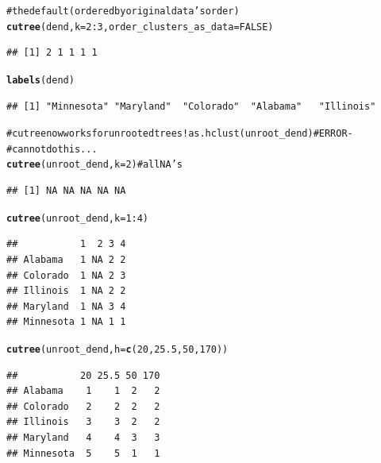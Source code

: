 \documentclass[shortnames,nojss,article]{jss}\usepackage{graphicx, color}
\makeatletter
\newcommand{\hlfunctioncall}[1]{\textcolor[rgb]{0.501960784313725,0,0.329411764705882}{\textbf{#1}}}%
\newcommand{\hlcomment}[1]{\textcolor[rgb]{0.180392156862745,0.6,0.341176470588235}{#1}}%
\newenvironment{kframe}{%
 \def\at@end@of@kframe{}%
 \ifinner\ifhmode%
  \def\at@end@of@kframe{\end{minipage}}%
  \begin{minipage}{\columnwidth}%
 \fi\fi%
 \def\FrameCommand##1{\hskip\@totalleftmargin \hskip-\fboxsep
 \colorbox{shadecolor}{##1}\hskip-\fboxsep
     \hskip-\linewidth \hskip-\@totalleftmargin \hskip\columnwidth}%
 \MakeFramed {\advance\hsize-\width
   \@totalleftmargin\z@ \linewidth\hsize
   \@setminipage}}%
 {\par\unskip\endMakeFramed%
 \at@end@of@kframe}
\newenvironment{knitrout}{}{} %
\makeatother
\begin{document}
\begin{knitrout}
\begin{kframe}
\begin{alltt}
\hlcomment{# the default (ordered by original data's order)}
\hlfunctioncall{cutree}(dend, k = 2:3, order_clusters_as_data = FALSE)
\end{alltt}
\begin{verbatim}
## [1] 2 1 1 1 1
\end{verbatim}
\begin{alltt}
\hlfunctioncall{labels}(dend)
\end{alltt}
\begin{verbatim}
## [1] "Minnesota" "Maryland"  "Colorado"  "Alabama"   "Illinois"
\end{verbatim}
\begin{alltt}

\hlcomment{# cutree now works for unrooted trees!  as.hclust(unroot_dend) # ERROR -}
\hlcomment{# can not do this...}
\hlfunctioncall{cutree}(unroot_dend, k = 2)  \hlcomment{# all NA's}
\end{alltt}


{\ttfamily\noindent\color{warningcolor}{\#\# Warning: Couldn't cut the tree - returning NA.}}

{\ttfamily\noindent\color{warningcolor}{\#\# Warning: You (probably) have some branches with equal heights so that there exist no height(h) that can create 2\ \ clusters}}\begin{verbatim}
## [1] NA NA NA NA NA
\end{verbatim}
\begin{alltt}
\hlfunctioncall{cutree}(unroot_dend, k = 1:4)
\end{alltt}


{\ttfamily\noindent\color{warningcolor}{\#\# Warning: Couldn't cut the tree - returning NA.}}

{\ttfamily\noindent\color{warningcolor}{\#\# Warning: You (probably) have some branches with equal heights so that there exist no height(h) that can create 2\ \ clusters}}\begin{verbatim}
##           1  2 3 4
## Alabama   1 NA 2 2
## Colorado  1 NA 2 3
## Illinois  1 NA 2 2
## Maryland  1 NA 3 4
## Minnesota 1 NA 1 1
\end{verbatim}
\begin{alltt}
\hlfunctioncall{cutree}(unroot_dend, h = \hlfunctioncall{c}(20, 25.5, 50, 170))
\end{alltt}
\begin{verbatim}
##           20 25.5 50 170
## Alabama    1    1  2   2
## Colorado   2    2  2   2
## Illinois   3    3  2   2
## Maryland   4    4  3   3
## Minnesota  5    5  1   1
\end{verbatim}
\begin{alltt}



\end{alltt}
\end{kframe}
\end{knitrout}
\end{document}
